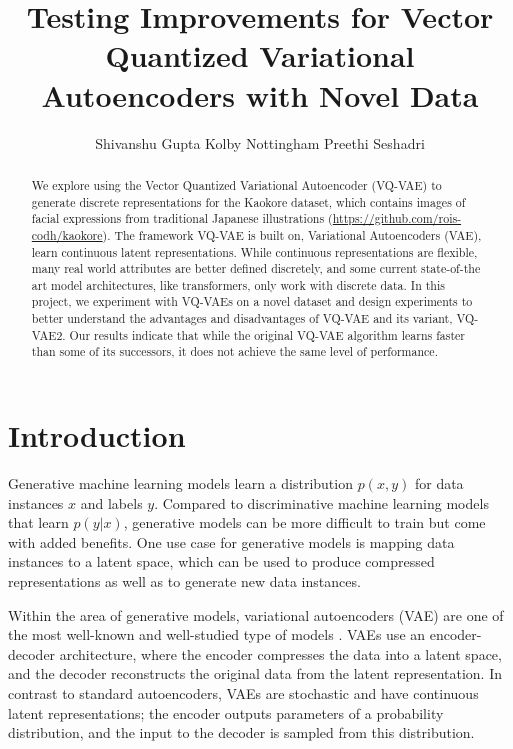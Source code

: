 \documentclass{article}
\title{Testing Improvements for Vector Quantized Variational Autoencoders with Novel Data}
\author{
  Shivanshu Gupta
  \And
  Kolby Nottingham
  \And
  Preethi Seshadri
}
\begin{document}
\maketitle

\begin{abstract}
    We explore using the Vector Quantized Variational Autoencoder (VQ-VAE) to generate discrete representations for the Kaokore dataset, which contains images of facial expressions from traditional Japanese illustrations (\url{https://github.com/rois-codh/kaokore}).
    The framework VQ-VAE is built on, Variational Autoencoders (VAE), learn continuous latent representations.
    While continuous representations are flexible, many real world attributes are better defined discretely, and some current state-of-the art model architectures, like transformers, only work with discrete data. 
    In this project, we experiment with VQ-VAEs on a novel dataset and design experiments to better understand the advantages and disadvantages of VQ-VAE and its variant, VQ-VAE2.
    Our results indicate that while the original VQ-VAE algorithm learns faster than some of its successors, it does not achieve the same level of performance. 
\end{abstract}

\section{Introduction}

Generative machine learning models learn a distribution $p(x,y)$ for data instances $x$ and labels $y$. Compared to discriminative machine learning models that learn $p(y|x)$, generative models can be more difficult to train but come with added benefits. One use case for generative models is mapping data instances to a latent space, which can be used to produce compressed representations as well as to generate new data instances. 

Within the area of generative models, variational autoencoders (VAE) are one of the most well-known and well-studied type of models \cite{VAE}. VAEs use an encoder-decoder architecture, where the encoder compresses the data into a latent space, and the decoder reconstructs the original data from the latent representation. In contrast to standard autoencoders, VAEs are stochastic and have continuous latent representations; the encoder outputs parameters of a probability distribution, and the input to the decoder is sampled from this distribution.
\end{document}
